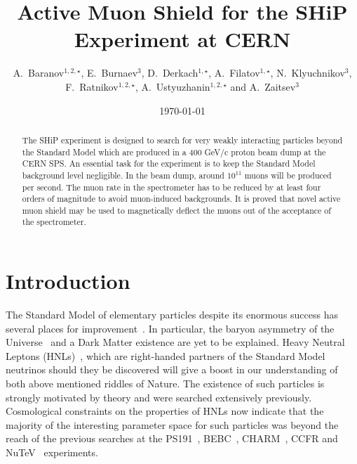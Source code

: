\documentclass[a4paper]{jpconf}
\theoremstyle{my_theorem_style}
\numberwithin{equation}{section}
\begin{document}
\title{Active Muon Shield for the SHiP Experiment at CERN}
\author{A.~Baranov$^{1,2,\star}$, E.~Burnaev$^{3}$,  D.~Derkach$^{1,\star}$, A.~Filatov$^{1,\star}$,
  N.~Klyuchnikov$^{3}$,  F.~Ratnikov$^{1,2,\star}$,
  A.~Ustyuzhanin$^{1,2,\star}$  and
 A.~Zaitsev$^{3}$
}
\address{$^1$ National Research University Higher School of Economics,  Moscow, Russia \\
$^2$ Yandex School of Data Analysis, Moscow, Russia \\
$^3$ Skolkovo Institute of Science and Technology, Moscow, Russia \\
$^\star$ on behalf of the LHCb Collaboration}

\begin{abstract}
The SHiP experiment is designed to search for very weakly interacting particles beyond the Standard Model which are produced in a 400 GeV/c proton beam dump at the CERN SPS. An essential task for the experiment is to keep the Standard Model background level negligible. In the beam dump, around $10^{11}$ muons will be produced per second. The muon rate in the spectrometer has to be reduced by at least four orders of magnitude to avoid muon-induced backgrounds. It is proved that novel active muon shield may be used to magnetically deflect the muons out of the acceptance of the spectrometer.
\end{abstract}

\date{\today}



\section{Introduction}
\label{intro}
The Standard Model of elementary particles despite its enormous success has several places for improvement~\cite{Ellis:2009tp}. In particular, the baryon asymmetry of the Universe~\cite{Asaka:2005pn} and a Dark Matter existence are yet to be explained. Heavy Neutral Leptons (HNLs)~\cite{Asaka:2005an}, which are right-handed partners of the Standard Model neutrinos should they be discovered will give a boost in our understanding of both above mentioned riddles of Nature. The existence of such particles is strongly motivated by theory and were searched extensively previously. Cosmological constraints on the properties of HNLs now indicate that the majority of the interesting parameter space for such particles was beyond the reach of the previous searches at the PS191~\cite{Bernardi:1985ny}, BEBC~\cite{CooperSarkar:1985nh}, CHARM~\cite{Bergsma:1985is}, CCFR and NuTeV~\cite{Vaitaitis:1999wq} experiments. 
\end{document}
